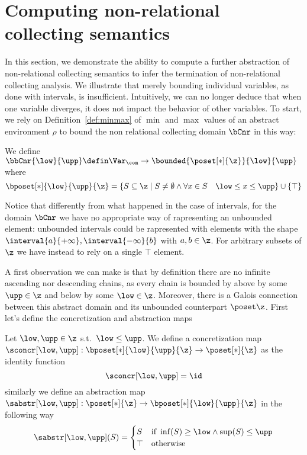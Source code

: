 \section{Computing non-relational collecting semantics}\label{sec:computingnonrel}

In this section, we demonstrate the ability to compute a further
abstraction of non-relational collecting semantics to infer the
termination of non-relational collecting analysis. We illustrate that
merely bounding individual variables, as done with intervals, is
insufficient. Intuitively, we can no longer deduce that when one
variable diverges, it does not impact the behavior of other variables.
To start, we rely on Definition~\ref{def:minmax} of \(\min\) and
\(\max\) values of an abstract environment \(\rho\) to bound the non
relational collecting domain \(\bCnr\) in this way:

\begin{definition}
  We define
  \(\bbCnr{\low}{\upp} \defin \Var_{\com} \to \bounded{\poset[*]{\z}}{\low}{\upp}\) where
  \begin{equation*}
    \bposet[*]{\low}{\upp}{\z} = \{S \subseteq \z \mid S \neq \emptyset \land \forall x \in S \quad \low \leq x \leq \upp\} \cup \{\top\}
  \end{equation*}
\end{definition}
Notice that differently from what happened in the case of intervals,
for the domain \(\bCnr\) we have no appropriate way of rapresenting an
unbounded element: unbounded intervals could be rapresented with
elements with the shape
\(\interval{a}{+\infty}, \interval{-\infty}{b}\) with \(a,b\in
\z\). For arbitrary subsets of \(\z\) we have instead to rely on a
single \(\top\) element.

\medskip

\noindent
A first observation we can make is that by definition there are no
infinite ascending nor descending chains, as every chain is bounded by
above by some \(\upp \in \z\) and below by some \(\low\in\z\). Moreover,
there is a Galois connection between this abstract domain and its
unbounded counterpart \(\poset\z\). First let's define the
concretization and abstraction maps

\begin{definition}\label{def:abstrnrb}
  Let \(\low,\upp\in\z\) s.t.\ \(\low \leq \upp\). We define a
  concretization map
  \(\sconcr[\low,\upp] : \bposet[*]{\low}{\upp}{\z} \to \poset[*]{\z}\) as
  the identity function
  \begin{equation*}
    \sconcr[\low,\upp] = \id
  \end{equation*}
  similarly we define an abstraction map
  \(\sabstr[\low,\upp] : \poset[*]{\z} \to \bposet[*]{\low}{\upp}{\z}\) in
  the following way
  \begin{equation*}
    \sabstr[\low,\upp](S) = \begin{cases}
      S & \text{if } \inf(S) \geq \low \land \sup(S) \leq \upp \\
      \top & \text{otherwise}
    \end{cases}
  \end{equation*}
\end{definition}

